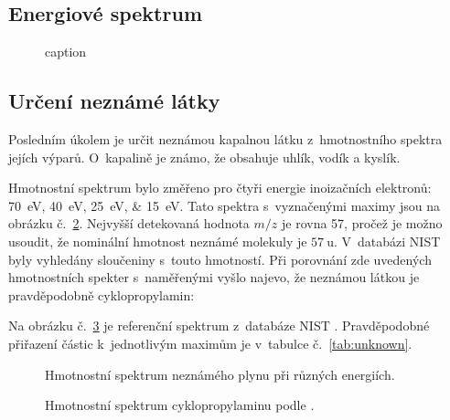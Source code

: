 \documentclass{protokol}
\newcommand\mz{m/z}
\begin{document}
\subsection{Energiové spektrum}

\begin{figure}[htp]
	\centering
	
	
	\caption{caption}
	\label{fig:energy}
\end{figure}

\subsection{Určení neznámé látky}
\label{sec:unknown}
Posledním úkolem je určit neznámou kapalnou látku z~hmotnostního spektra
jejích výparů.
O~kapalině je známo, že obsahuje uhlík, vodík a kyslík.

Hmotnostní spektrum bylo změřeno pro čtyři energie inoizačních elektronů:
\SIlist[list-separator={, }]{70;40;25;15}{\electronvolt}.
Tato spektra s~vyznačenými maximy jsou na obrázku č.~\ref{fig:unknown-all}.
Nejvyšší detekovaná hodnota $\mz$ je rovna \SI{57}{\thomson},
pročež je možno usoudit, že nominální hmotnost neznámé molekuly
je $\SI{57}{\amu}$.
V~databázi NIST~\parencite{nist} byly vyhledány sloučeniny s~touto hmotností.
Při porovnání zde uvedených hmotnostních spekter s~naměřenými vyšlo najevo,
že neznámou látkou je pravděpodobně cyklopropylamin:
\begin{center}
\end{center}

Na obrázku č.~\ref{fig:cyclopropylamine-nist} je referenční spektrum
z~databáze NIST \parencite{nist}.
Pravděpodobné přiřazení částic k~jednotlivým maximům je
v~tabulce č.~\ref{tab:unknown}.

\begin{figure}[htp]
	\centering
	
	\caption{Hmotnostní spektrum neznámého plynu při různých energiích.}
	\label{fig:unknown-all}
\end{figure}

\begin{figure}[htp]
	\centering
	
	\caption{Hmotnostní spektrum cyklopropylaminu podle \cite{nist}.}
	\label{fig:cyclopropylamine-nist}
\end{figure}
\end{document}
